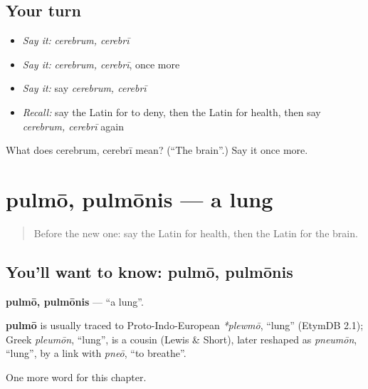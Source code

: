 \subsection*{Your turn}
\begin{itemize}
\raggedright
  \item \emph{Say it:} \emph{cerebrum, cerebrī}
  \item \emph{Say it:} \emph{cerebrum, cerebrī}, once more
  \item \emph{Say it:} say \emph{cerebrum, cerebrī}
  \item \emph{Recall:} say the Latin for to deny, then the Latin for health, then say \emph{cerebrum, cerebrī} again
\end{itemize}

\begin{tcolorbox}[breakable,colback=teal!4,colframe=teal!35!black,title={Before you move on}]
What does cerebrum, cerebrī mean? (\textquotedblleft{}The brain\textquotedblright{}.) Say it once more.
\end{tcolorbox}
\section[pulmō, pulmōnis]{pulmō, pulmōnis — a lung}

\label{lesson:LA-C173-pulmo}



\begin{quote}
Before the new one: say the Latin for health, then the Latin for the brain.
\end{quote}

\subsection*{You'll want to know: pulmō, pulmōnis}
\textbf{pulmō, pulmōnis} — \textquotedblleft{}a lung\textquotedblright{}.

\begin{cousinweb}
\textbf{pulmō} is usually traced to Proto-Indo-European \emph{*plewmō}, \textquotedblleft{}lung\textquotedblright{} (EtymDB 2.1); Greek \emph{pleumōn}, \textquotedblleft{}lung\textquotedblright{}, is a cousin (Lewis \& Short), later reshaped as \emph{pneumōn}, \textquotedblleft{}lung\textquotedblright{}, by a link with \emph{pneō}, \textquotedblleft{}to breathe\textquotedblright{}.
\end{cousinweb}

\begin{grammarlens}[title={What you've built}]
One more word for this chapter.
\end{grammarlens}


